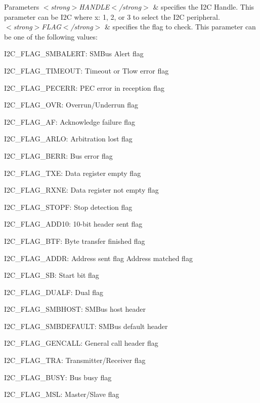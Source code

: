 \begin{DoxyParams}{Parameters}
{\em $<$strong$>$\+H\+A\+N\+D\+L\+E$<$/strong$>$} & specifies the I2C Handle. This parameter can be I2C where x\+: 1, 2, or 3 to select the I2C peripheral. \\
\hline
{\em $<$strong$>$\+F\+L\+A\+G$<$/strong$>$} & specifies the flag to check. This parameter can be one of the following values\+: \begin{DoxyItemize}
\item I2\+C\+\_\+\+F\+L\+A\+G\+\_\+\+S\+M\+B\+A\+L\+E\+RT\+: S\+M\+Bus Alert flag \item I2\+C\+\_\+\+F\+L\+A\+G\+\_\+\+T\+I\+M\+E\+O\+UT\+: Timeout or Tlow error flag \item I2\+C\+\_\+\+F\+L\+A\+G\+\_\+\+P\+E\+C\+E\+RR\+: P\+EC error in reception flag \item I2\+C\+\_\+\+F\+L\+A\+G\+\_\+\+O\+VR\+: Overrun/\+Underrun flag \item I2\+C\+\_\+\+F\+L\+A\+G\+\_\+\+AF\+: Acknowledge failure flag \item I2\+C\+\_\+\+F\+L\+A\+G\+\_\+\+A\+R\+LO\+: Arbitration lost flag \item I2\+C\+\_\+\+F\+L\+A\+G\+\_\+\+B\+E\+RR\+: Bus error flag \item I2\+C\+\_\+\+F\+L\+A\+G\+\_\+\+T\+XE\+: Data register empty flag \item I2\+C\+\_\+\+F\+L\+A\+G\+\_\+\+R\+X\+NE\+: Data register not empty flag \item I2\+C\+\_\+\+F\+L\+A\+G\+\_\+\+S\+T\+O\+PF\+: Stop detection flag \item I2\+C\+\_\+\+F\+L\+A\+G\+\_\+\+A\+D\+D10\+: 10-\/bit header sent flag \item I2\+C\+\_\+\+F\+L\+A\+G\+\_\+\+B\+TF\+: Byte transfer finished flag \item I2\+C\+\_\+\+F\+L\+A\+G\+\_\+\+A\+D\+DR\+: Address sent flag Address matched flag \item I2\+C\+\_\+\+F\+L\+A\+G\+\_\+\+SB\+: Start bit flag \item I2\+C\+\_\+\+F\+L\+A\+G\+\_\+\+D\+U\+A\+LF\+: Dual flag \item I2\+C\+\_\+\+F\+L\+A\+G\+\_\+\+S\+M\+B\+H\+O\+ST\+: S\+M\+Bus host header \item I2\+C\+\_\+\+F\+L\+A\+G\+\_\+\+S\+M\+B\+D\+E\+F\+A\+U\+LT\+: S\+M\+Bus default header \item I2\+C\+\_\+\+F\+L\+A\+G\+\_\+\+G\+E\+N\+C\+A\+LL\+: General call header flag \item I2\+C\+\_\+\+F\+L\+A\+G\+\_\+\+T\+RA\+: Transmitter/\+Receiver flag \item I2\+C\+\_\+\+F\+L\+A\+G\+\_\+\+B\+U\+SY\+: Bus busy flag \item I2\+C\+\_\+\+F\+L\+A\+G\+\_\+\+M\+SL\+: Master/\+Slave flag \end{DoxyItemize}
\\
\hline
\end{DoxyParams}

